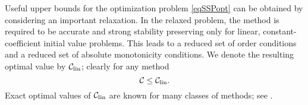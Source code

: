 Useful upper bounds for the optimization problem \eqref{eqSSPopt} can be obtained
by considering an important relaxation.  In the relaxed problem, the method is
required to be accurate and strong stability preserving only for linear,
constant-coefficient initial value problems.  This leads to a reduced set of
order conditions and a reduced set of absolute monotonicity conditions.  We
denote the resulting optimal value by $\mathcal{C}_{\text{lin}}$; clearly for any method
$$\mathcal{C}\le\mathcal{C}_{\text{lin}}.$$
Exact optimal values of $\mathcal{C}_{\text{lin}}$ are known for many classes of methods; see
\cite{Kraaijevanger1986,ketcheson2009a}.



